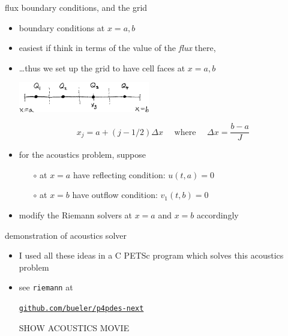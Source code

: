 \documentclass[10pt,hyperref,dvipsnames]{beamer}
\begin{document}
\begin{frame}{flux boundary conditions, and the grid}

\begin{itemize}
\item boundary conditions at $x=a,b$
\item easiest if think in terms of the value of the \emph{flux} there,
\item \dots thus we set up the grid to have cell faces at $x=a,b$

\medskip
\begin{center}
\includegraphics[width=0.45\textwidth]{figs/fluxbdrysketch}
\end{center}

\vspace{-2mm}
    $$x_j = a + (j-1/2) \Delta x \quad \text{ where } \quad \Delta x = \frac{b-a}{J}$$

\item for the acoustics problem, suppose
    \begin{itemize}
    \item[$\circ$] at $x=a$ have reflecting condition: $u(t,a)=0$
    \item[$\circ$] at $x=b$ have outflow condition: $v_1(t,b)=0$
    \end{itemize}
\item modify the Riemann solvers at $x=a$ and $x=b$ accordingly
\end{itemize}
\end{frame}


\begin{frame}{demonstration of acoustics solver}

\begin{itemize}
\item I used all these ideas in a C PETSc program which solves this acoustics problem
\item see \texttt{riemann} at
\begin{center}
\href{https://github.com/bueler/p4pdes-next}{\texttt{github.com/bueler/p4pdes-next}}
\end{center}

\vspace{3mm}
\begin{center}
\alert{SHOW ACOUSTICS MOVIE}
\end{center}
\end{itemize}

\end{frame}
\end{document}
